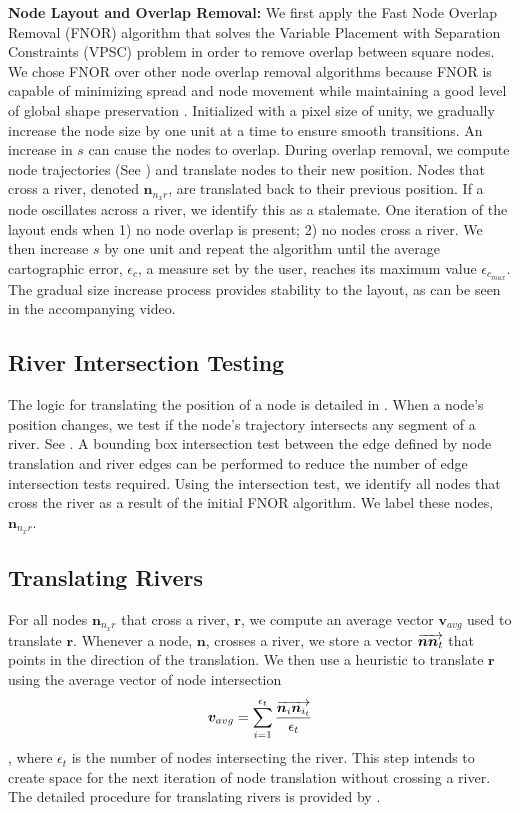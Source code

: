 \documentclass[Afour,sagev,times]{sagej}
\newcommand{\bobgraph}[1]{\noindent\textbf{#1}}
\newcommand{\Vector}[1]{\protect\overrightarrow{#1}}
\newcommand{\nodeSize}{s}
\newcommand{\nodeError}{\epsilon}
\newcommand{\nodeCartographicError}{\nodeError_{c}}
\newcommand{\nodeCartographicErrorMax}{\nodeError_{c_{max}}}
\newcommand{\nodeTopologicalError}{\nodeError_{t}}
\newcommand{\node}{\bm{n}}
\newcommand{\river}{\bm{r}}
\newcommand{\nodeVectorNNn}{\Vector{\node\node_{t}}}
\newcommand{\vectorAvg}{\bm{v}_{avg}}
\newcommand{\NxR}{\node_{n_{x}r}}
\begin{document}
\bobgraph{Node Layout and Overlap Removal:} We first apply the Fast Node Overlap Removal (FNOR) algorithm that solves the Variable Placement with Separation Constraints (VPSC) problem \cite{dwyer2006Fast} in order to remove overlap between square nodes. We chose FNOR over other node overlap removal algorithms because FNOR is capable of minimizing spread and node movement while maintaining a good level of global shape preservation \cite{chen2020Node}. Initialized with a pixel size of unity, we gradually increase the node size by one unit at a time to ensure smooth transitions. An increase in $ \nodeSize $ can cause the nodes to overlap. During overlap removal, we compute node trajectories (See ) and translate nodes to their new position. Nodes that cross a river, denoted $ \NxR $, are translated back to their previous position. If a node oscillates across a river, we identify this as a stalemate. One iteration of the layout ends when 1) no node overlap is present; 2) no nodes cross a river. We then increase $ \nodeSize $ by one unit and repeat the algorithm until the average cartographic error, $ \nodeCartographicError $, a measure set by the user, reaches its maximum value $ \nodeCartographicErrorMax $. The gradual size increase process provides stability to the layout, as can be seen in the accompanying video.

\subsection{River Intersection Testing}
\label{subsec:{River Intersection Testing}}

The logic for translating the position of a node is detailed in . When a node's position changes, we test if the node's trajectory intersects any segment of a river. See . A bounding box intersection test between the edge defined by node translation and river edges can be performed to reduce the number of edge intersection tests required. Using the intersection test, we identify all nodes that cross the river as a result of the initial FNOR algorithm. We label these nodes, $ \NxR $.

\subsection{Translating Rivers}
\label{subsec:{Translating Rivers}}

For all nodes $ \NxR $ that cross a river, $ \river $, we compute an average vector $ \vectorAvg $ used to translate $ \river $. Whenever a node, $ \node $, crosses a river, we store a vector $ \nodeVectorNNn $ that points in the direction of the translation. We then use a heuristic to translate $ \river $ using the average vector of node intersection $$ \vectorAvg = \sum_{i=1}^{\nodeTopologicalError} \frac{\Vector{\node_i\node_{i_t}}}{\nodeTopologicalError} $$, where $ \nodeTopologicalError $ is the number of nodes intersecting the river. This step intends to create space for the next iteration of node translation without crossing a river. The detailed procedure for translating rivers is provided by .
\end{document}

